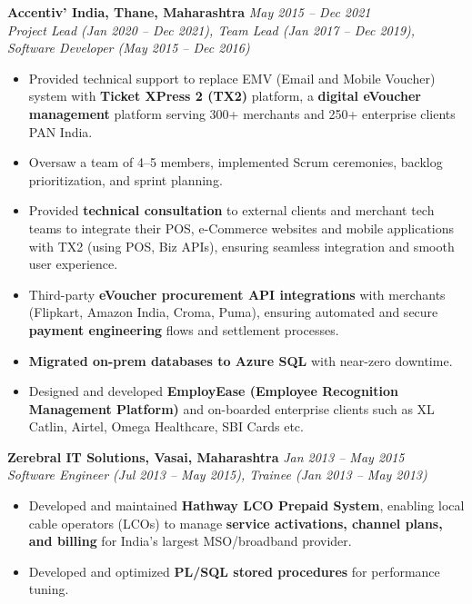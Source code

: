 \documentclass[12pt,a4paper]{article}
\begin{document}
\textbf{Accentiv' India, Thane, Maharashtra} \hfill \textit{May 2015 -- Dec 2021}\\
\textit{Project Lead (Jan 2020 -- Dec 2021), \newline Team Lead (Jan 2017 -- Dec 2019), \newline Software Developer (May 2015 -- Dec 2016)}
\begin{itemize}
    \item Provided technical support to replace EMV (Email and Mobile Voucher) system with \textbf{Ticket XPress 2 (TX2)} platform, a \textbf{digital eVoucher management} platform serving 300+ merchants and 250+ enterprise clients PAN India.
    \item Oversaw a team of 4--5 members, implemented Scrum ceremonies, backlog prioritization, and sprint planning.
    \item Provided \textbf{technical consultation} to external clients and merchant tech teams to integrate their POS, e-Commerce websites and mobile applications with TX2 (using POS, Biz APIs), ensuring seamless integration and smooth user experience.
    \item Third-party \textbf{eVoucher procurement API integrations} with merchants (Flipkart, Amazon India, Croma, Puma), ensuring automated and secure \textbf{payment engineering} flows and settlement processes.
    \item \textbf{Migrated on-prem databases to Azure SQL} with near-zero downtime.
    \item Designed and developed \textbf{EmployEase (Employee Recognition Management Platform)} and on-boarded enterprise clients such as XL Catlin, Airtel, Omega Healthcare, SBI Cards etc.
\end{itemize}

\textbf{Zerebral IT Solutions, Vasai, Maharashtra} \hfill \textit{Jan 2013 -- May 2015}\\
\textit{Software Engineer (Jul 2013 -- May 2015), \newline Trainee (Jan 2013 -- May 2013)}
\begin{itemize}
    \item Developed and maintained \textbf{Hathway LCO Prepaid System}, enabling local cable operators (LCOs) to manage \textbf{service activations, channel plans, and billing} for India's largest MSO/broadband provider.
    \item Developed and optimized \textbf{PL/SQL stored procedures} for performance tuning.
\end{itemize}
\end{document}
